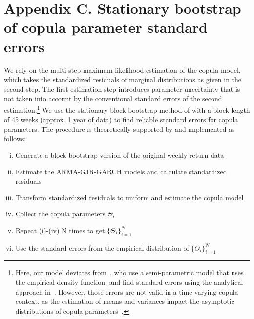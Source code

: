 \newpage
\section{Appendix C. Stationary bootstrap of copula parameter standard errors} \label{App:AppendixC}
We rely on the multi-step maximum likelihood estimation of the copula model, which takes the standardized residuals of marginal distributions as given in the second step. The first estimation step introduces parameter uncertainty that is not taken into account by the conventional standard errors of the second estimation.\footnote{Here, our model deviates from~\textcite{ChristoffersenLanglois2013}, who use a semi-parametric model that uses the empirical density function, and find standard errors using the analytical approach in~\textcite{ChenFan2006}. However, those errors are not valid in a time-varying copula context, as the estimation of means and variances impact the asymptotic distributions of copula parameters~\autocite{Remillard2010}.} We use the stationary block bootstrap method of \textcite{PolitisRomano1994} with a block length of 45 weeks (approx. 1 year of data) to find reliable standard errors for copula parameters. The procedure is theoretically supported by \textcite{GonclavesWhite2004} and implemented as follows:
\begin{enumerate}[(i)]
    \item Generate a block bootstrap version of the original weekly return data
    \item Estimate the ARMA-GJR-GARCH models and calculate standardized residuals
    \item Transform standardized residuals to uniform and estimate the copula model
    \item Collect the copula parameters $\Theta_i$
    \item Repeat (i)-(iv) N times to get $\{\Theta_i\}^{N}_{i=1}$
    \item Use the standard errors from the empirical distribution of $\{\Theta_i\}^{N}_{i=1}$
\end{enumerate}

\newpage
